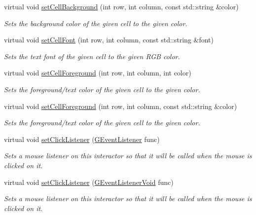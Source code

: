 \begin{DoxyCompactItemize}
virtual void \mbox{\hyperlink{classsgl_1_1GTable_af2d2fa204d2f9260081102a990310cd7}{set\+Cell\+Background}} (int row, int column, const std\+::string \&color)
\begin{DoxyCompactList}\small\item\em Sets the background color of the given cell to the given color. \end{DoxyCompactList}\item 
virtual void \mbox{\hyperlink{classsgl_1_1GTable_a8c3d80b0163f465c7306b075d5895313}{set\+Cell\+Font}} (int row, int column, const std\+::string \&font)
\begin{DoxyCompactList}\small\item\em Sets the text font of the given cell to the given R\+GB color. \end{DoxyCompactList}\item 
virtual void \mbox{\hyperlink{classsgl_1_1GTable_a19969b2f2b0cbf219333b02c047b2e7e}{set\+Cell\+Foreground}} (int row, int column, int color)
\begin{DoxyCompactList}\small\item\em Sets the foreground/text color of the given cell to the given color. \end{DoxyCompactList}\item 
virtual void \mbox{\hyperlink{classsgl_1_1GTable_ab0bdc2afa7ef003fa5e8ab6eb25a7282}{set\+Cell\+Foreground}} (int row, int column, const std\+::string \&color)
\begin{DoxyCompactList}\small\item\em Sets the foreground/text color of the given cell to the given color. \end{DoxyCompactList}\item 
virtual void \mbox{\hyperlink{classsgl_1_1GInteractor_abd40af6921242584d0954f173911b190}{set\+Click\+Listener}} (\mbox{\hyperlink{namespacesgl_ae9f3e9eab70035da1a2b114e21357b25}{G\+Event\+Listener}} func)
\begin{DoxyCompactList}\small\item\em Sets a mouse listener on this interactor so that it will be called when the mouse is clicked on it. \end{DoxyCompactList}\item 
virtual void \mbox{\hyperlink{classsgl_1_1GInteractor_a856414c92df90f56f3877475eb3f8fc4}{set\+Click\+Listener}} (\mbox{\hyperlink{namespacesgl_a54427ce97bb1c2804e4fe2b0a62e8b17}{G\+Event\+Listener\+Void}} func)
\begin{DoxyCompactList}\small\item\em Sets a mouse listener on this interactor so that it will be called when the mouse is clicked on it. \end{DoxyCompactList}\item 

\end{DoxyCompactItemize}
